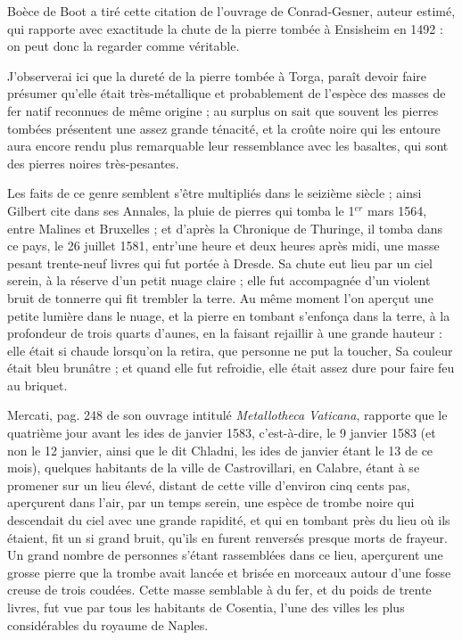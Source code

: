 \documentclass[a4paper, 12pt, oneside, french]{article}
\begin{document}
Boèce de Boot a tiré cette citation de l'ouvrage de Conrad-Gesner, auteur estimé, qui rapporte avec exactitude la chute de la pierre tombée à Ensisheim en 1492 : on peut donc la regarder comme véritable.

J'observerai ici que la dureté de la pierre tombée à Torga, paraît devoir faire présumer qu'elle était très-métallique et probablement de l'espèce des masses de fer natif reconnues de même origine ; au surplus on sait que souvent les pierres tombées présentent une assez grande ténacité, et la croûte noire qui les entoure aura encore rendu plus remarquable leur ressemblance avec les basaltes, qui sont des pierres noires très-pesantes.

Les faits de ce genre semblent s'être multipliés dans le seizième siècle ; ainsi Gilbert cite dans ses Annales, la pluie de pierres qui tomba le 1$^{er}$ mars 1564, entre Malines et Bruxelles ; et d'après la Chronique de Thuringe, il tomba dans ce pays, le 26 juillet 1581, entr'une heure et deux heures après midi, une masse pesant trente-neuf livres qui fut portée à Dresde. Sa chute eut lieu par un ciel serein, à la réserve d'un petit nuage claire ; elle fut accompagnée d'un violent bruit de tonnerre qui fit trembler la terre. Au même moment l'on aperçut une petite lumière dans le nuage, et la pierre en tombant s'enfonça dans la terre, à la profondeur de trois quarts d'aunes, en la faisant rejaillir à une grande hauteur : elle était si chaude lorsqu’on la retira, que personne ne put la toucher, Sa couleur était bleu brunâtre ; et quand elle fut refroidie, elle était assez dure pour faire feu au briquet.

Mercati, pag. 248 de son ouvrage intitulé \emph{Metallotheca Vaticana}, rapporte que le quatrième jour avant les ides de janvier 1583, c'est-à-dire, le 9 janvier 1583 (et non le 12 janvier, ainsi que le dit Chladni, les ides de janvier étant le 13 de ce mois), quelques habitants de la ville de Castrovillari, en Calabre, étant à se promener sur un lieu élevé, distant de cette ville d'environ cinq cents pas, aperçurent dans l'air, par un temps serein, une espèce de trombe noire qui descendait du ciel avec une grande rapidité, et qui en tombant près du lieu où ils étaient, fit un si grand bruit, qu'ils en furent renversés presque morts de frayeur. Un grand nombre de personnes s'étant rassemblées dans ce lieu, aperçurent une grosse pierre que la trombe avait lancée et brisée en morceaux autour d'une fosse creuse de trois coudées. Cette masse semblable à du fer, et du poids de trente livres, fut vue par tous les habitants de Cosentia, l'une des villes les plus considérables du royaume de Naples.
\end{document}
